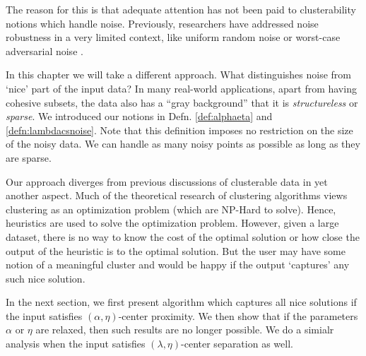 \documentclass[letterpaper,12pt,titlepage,oneside,final]{book}
\begin{document}
The reason for this is that adequate attention has not been paid to clusterability notions which handle noise. Previously, researchers have addressed noise robustness in a very limited context, like uniform random noise or worst-case adversarial noise \cite{balcan2012clustering,ackerman2009clusterability}.

In this chapter we will take a different approach. What distinguishes noise from `nice' part of the input data? In many real-world applications, apart from having cohesive subsets, the data also has a ``gray background'' that it is \emph{structureless} or \emph{sparse}. We introduced our notions in Defn. \ref{def:alphaeta} and \ref{defn:lambdacsnoise}. Note that this definition imposes no restriction on the size of the noisy data.  We can handle as many noisy points as possible as long as they are sparse. 

Our approach diverges from previous discussions of clusterable data in yet another aspect. Much of the theoretical research of clustering algorithms views clustering as an optimization problem (which are NP-Hard to solve). Hence, heuristics are used to solve the optimization problem. However, given a large dataset, there is no way to know the cost of the optimal solution or how close the output of the heuristic is to the optimal solution. But the user may have some notion of a meaningful cluster and would be happy if the output `captures' any such nice solution. 

In the next section, we first present algorithm which captures all nice solutions if the input satisfies $(\alpha, \eta)$-center proximity. We then show that if the parameters $\alpha$ or $\eta$ are relaxed, then such results are no longer possible. We do a simialr analysis when the input satisfies $(\lambda, \eta)$-center separation as well.  
\end{document}
